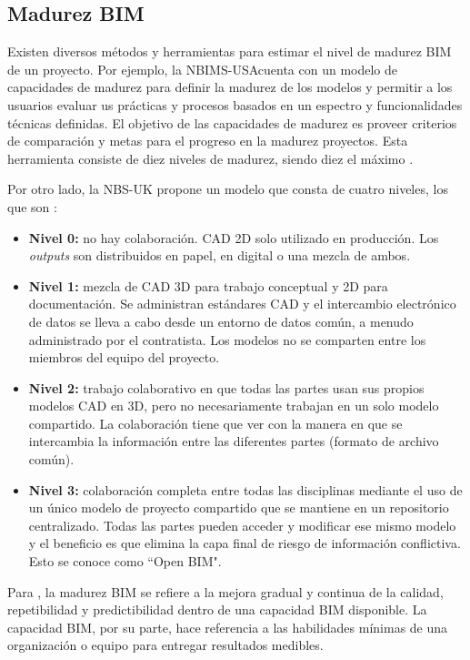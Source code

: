 \subsection{Madurez BIM} 

Existen diversos métodos y herramientas para estimar el nivel de madurez BIM de un proyecto. Por ejemplo, la NBIMS-USA\textregistered cuenta con un modelo de capacidades de madurez para definir la madurez de los modelos y permitir a los usuarios evaluar us prácticas y procesos basados en un espectro y funcionalidades técnicas definidas. El objetivo de las capacidades de madurez es proveer criterios de comparación y metas para el progreso en la madurez proyectos. Esta herramienta consiste de diez niveles de madurez, siendo diez el máximo \cite{trejo2018estudio}.

Por otro lado, la NBS-UK propone un modelo que consta de cuatro niveles, los que son \cite{trejo2018estudio}:


\begin{itemize}
    \item \textbf{Nivel 0:} no hay colaboración. CAD 2D solo utilizado en producción. Los \textit{outputs} son distribuidos en papel, en digital o una mezcla de ambos.
    \item \textbf{Nivel 1:} mezcla de CAD 3D para trabajo conceptual y 2D para documentación. Se administran estándares CAD y el intercambio electrónico de datos se lleva a cabo desde un entorno de datos común, a menudo administrado por el contratista. Los modelos no se comparten entre los miembros del equipo del proyecto.
    \item \textbf{Nivel 2:} trabajo colaborativo en que todas las partes usan sus propios modelos CAD en 3D, pero no necesariamente trabajan en un solo modelo compartido. La colaboración tiene que ver con la manera en que se intercambia la información entre las diferentes partes (formato de archivo común).
    \item \textbf{Nivel 3:} colaboración completa entre todas las disciplinas mediante el uso de un único modelo de proyecto compartido que se mantiene en un repositorio centralizado. Todas las partes pueden acceder y modificar ese mismo modelo y el beneficio es que elimina la capa final de riesgo de información conflictiva. Esto se conoce como ``Open BIM".
\end{itemize}

Para , la madurez BIM se refiere a la mejora gradual y continua de la calidad, repetibilidad y predictibilidad dentro de una capacidad BIM disponible. La capacidad BIM, por su parte, hace referencia a las habilidades mínimas de una organización o equipo para entregar resultados medibles.

